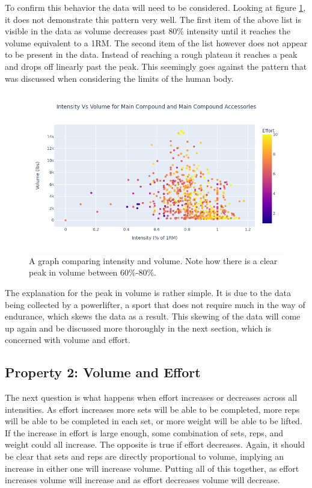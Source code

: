 To confirm this behavior the data will need to be considered. Looking at figure \ref{fig:IntensityVsVolumeGraph}, it does not demonstrate this pattern very well. The first item of the above list is visible in the data as volume decreases past $80$\% intensity until it reaches the volume equivalent to a 1RM. The second item of the list however does not appear to be present in the data. Instead of reaching a rough plateau it reaches a peak and drops off linearly past the peak. This seemingly goes against the pattern that was discussed when considering the limits of the human body.

\begin{figure}
    \centering
    \includegraphics[scale=0.55]{images/ch3/IntensityVsVolume.png}
    \caption{A graph comparing intensity and volume. Note how there is a clear peak in volume between $60\%$-$80\%$.} 
    \label{fig:IntensityVsVolumeGraph}
\end{figure}

The explanation for the peak in volume is rather simple. It is due to the data being collected by a powerlifter, a sport that does not require much in the way of endurance, which skews the data as a result. This skewing of the data will come up again and be discussed more thoroughly in the next section, which is concerned with volume and effort.


\subsection{Property 2: Volume and Effort}
\label{sec:PotentialSurfaceIntuitiveRelationshipsBetweenVariablesVolumeAndEffort}

The next question is what happens when effort increases or decreases across all intensities. As effort increases more sets will be able to be completed, more reps will be able to be completed in each set, or more weight will be able to be lifted. If the increase in effort is large enough, some combination of sets, reps, and weight could all increase. The opposite is true if effort decreases. Again, it should be clear that sets and reps are directly proportional to volume, implying an increase in either one will increase volume. Putting all of this together, as effort increases volume will increase and as effort decreases volume will decrease.

